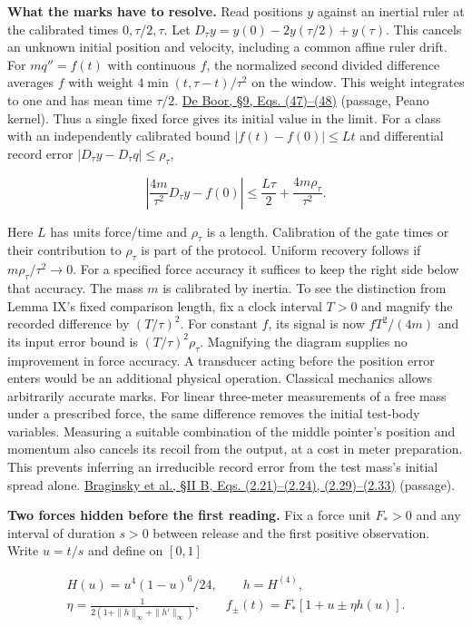 \documentclass[11pt,a4paper]{article}
\begin{document}
\textbf{What the marks have to resolve.} Read positions \(y\) against an
inertial ruler at the calibrated times \(0,\tau/2,\tau\). Let
\(D_\tau y=y(0)-2y(\tau/2)+y(\tau)\). This cancels an unknown initial
position and velocity, including a common affine ruler drift. For
\(m q''=f(t)\) with continuous \(f\), the normalized second divided
difference averages \(f\) with weight \(4\min(t,\tau-t)/\tau^2\) on the
window. This weight integrates to one and has mean time \(\tau/2\).
\href{https://pages.cs.wisc.edu/~deboor/sat/papers/2/2.pdf\#page=17}{De
Boor, §9, Eqs. (47)--(48)} (passage, Peano kernel). Thus a single fixed
force gives its initial value in the limit. For a class with an
independently calibrated bound \(|f(t)-f(0)|\le Lt\) and differential
record error \(|D_\tau y-D_\tau q|\le\rho_\tau\),

\[
\left|\frac{4m}{\tau^2}D_\tau y-f(0)\right|
\le \frac{L\tau}{2}+\frac{4m\rho_\tau}{\tau^2}.
\]

Here \(L\) has units force/time and \(\rho_\tau\) is a length.
Calibration of the gate times or their contribution to \(\rho_\tau\) is
part of the protocol. Uniform recovery follows if
\(m\rho_\tau/\tau^2\to0\). For a specified force accuracy it suffices to
keep the right side below that accuracy. The mass \(m\) is calibrated by
inertia. To see the distinction from Lemma IX's fixed comparison length,
fix a clock interval \(T>0\) and magnify the recorded difference by
\((T/\tau)^2\). For constant \(f\), its signal is now \(fT^2/(4m)\) and
its input error bound is \((T/\tau)^2\rho_\tau\). Magnifying the diagram
supplies no improvement in force accuracy. A transducer acting before
the position error enters would be an additional physical operation.
Classical mechanics allows arbitrarily accurate marks. For linear
three-meter measurements of a free mass under a prescribed force, the
same difference removes the initial test-body variables. Measuring a
suitable combination of the middle pointer's position and momentum also
cancels its recoil from the output, at a cost in meter preparation. This
prevents inferring an irreducible record error from the test mass's
initial spread alone.
\href{https://arxiv.org/pdf/gr-qc/0109003\#page=7}{Braginsky et al., §II
B, Eqs. (2.21)--(2.24), (2.29)--(2.33)} (passage).

\textbf{Two forces hidden before the first reading.} Fix a force unit
\(F_*>0\) and any interval of duration \(s>0\) between release and the
first positive observation. Write \(u=t/s\) and define on \([0,1]\)

\[
\begin{gathered}
H(u)=u^4(1-u)^6/24,\qquad h=H^{(4)},\\
\eta=\frac{1}{2(1+\|h\|_\infty+\|h'\|_\infty)},\qquad
f_\pm(t)=F_*[1+u\pm\eta h(u)].
\end{gathered}
\]
\end{document}
